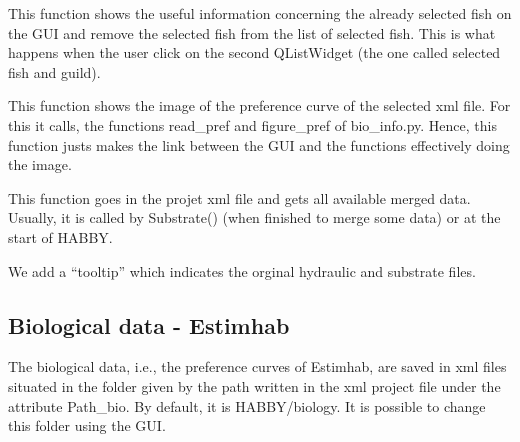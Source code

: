 \documentclass[letterpaper,10pt,english]{sphinxmanual}
\begin{document}
\begin{fulllineitems}
\begin{fulllineitems}
\end{fulllineitems}


\begin{fulllineitems}
\label{\detokenize{index:src_GUI.bio_info_GUI.BioInfo.show_info_fish_sel}}
This function shows the useful information concerning the already selected fish on the GUI and
remove the selected fish from the list of selected fish. This is what happens when the user click on the
second QListWidget (the one called selected fish and guild).

\end{fulllineitems}


\begin{fulllineitems}
\label{\detokenize{index:src_GUI.bio_info_GUI.BioInfo.show_pref}}
This function shows the image of the preference curve of the selected xml file. For this it calls, the functions
read\_pref and figure\_pref of bio\_info.py. Hence, this function justs makes the link between the GUI and
the functions effectively doing the image.

\end{fulllineitems}


\begin{fulllineitems}
\label{\detokenize{index:src_GUI.bio_info_GUI.BioInfo.update_merge_list}}
This function goes in the projet xml file and gets all available merged data. Usually, it is called
by Substrate() (when finished to merge some data) or at the start of HABBY.

We add a ``tooltip'' which indicates the orginal hydraulic and substrate files.

\end{fulllineitems}


\end{fulllineitems}



\subsection{Biological data - Estimhab}
\label{\detokenize{index:biological-data-estimhab}}
The biological data, i.e., the preference curves of Estimhab, are saved in xml files
situated in the folder given by the path written in the xml project file under the
attribute Path\_bio. By default, it is HABBY/biology. It is possible to change this folder
using the GUI.
\end{document}
